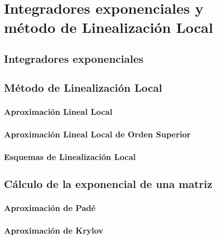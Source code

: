 \chapter{Integradores exponenciales y método de Linealización Local}\label{chapter:exp-int-and-ll-methods}

\section{Integradores exponenciales}

\section{Método de Linealización Local}

\subsection{Aproximación Lineal Local}

\subsection{Aproximación Lineal Local de Orden Superior}

\subsection{Esquemas de Linealización Local}

\section{Cálculo de la exponencial de una matriz}

\subsection{Aproximación de Padé}

\subsection{Aproximación de Krylov}